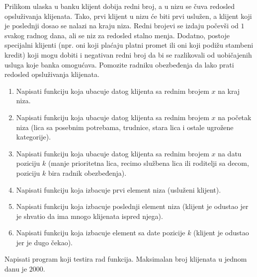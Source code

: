 \ifresenja
\begin{Answer}[ref=v.nizovi_funkcije_pomeranja]
\end{Answer}
\fi


\begin{Exercise}[label=izbacivanje_ubacivanje_u_niz] 
Prilikom ulaska u banku klijent dobija redni broj, a u nizu se čuva
redosled opsluživanja klijenata. Tako, prvi klijent u nizu će biti
prvi uslužen, a klijent koji je poslednji dosao se nalazi na kraju
niza. Redni brojevi se izdaju počevši od $1$ svakog radnog dana, ali
se niz za redosled stalno menja. Dodatno, postoje specijalni klijenti
(npr. oni koji plaćaju platni promet ili oni koji podižu stambeni
kredit) koji mogu dobiti i negativan redni broj da bi se razlikovali
od uobičajenih usluga koje banka omogućava. Pomozite radniku
obezbeđenja da lako prati redosled opsluživanja klijenata.
\begin{enumerate}
\item Napisati funkciju koja ubacuje datog klijenta sa rednim brojem
  $x$ na kraj niza.
\item Napisati funkciju koja ubacuje datog klijenta sa rednim brojem
  $x$ na početak niza (lica sa posebnim potrebama, trudnice, stara
  lica i ostale ugrožene kategorije).
\item Napisati funkciju koja ubacuje datog klijenta sa rednim brojem
  $x$ na datu poziciju $k$ (manje prioritetna lica, recimo službena
  lica ili roditelji sa decom, poziciju $k$ bira radnik obezbeđenja).
\item Napisati funkciju koja izbacuje prvi element niza (usluženi
  klijent).
\item Napisati funkciju koja izbacuje poslednji element niza (klijent
  je odustao jer je shvatio da ima mnogo klijenata ispred njega).
\item Napisati funkciju koja izbacuje element sa date pozicije $k$
  (klijent je odustao jer je dugo čekao).
\end{enumerate}
Napisati program koji testira rad funkcija. Maksimalan broj klijenata
u jednom danu je $2000$.


\end{Exercise}
